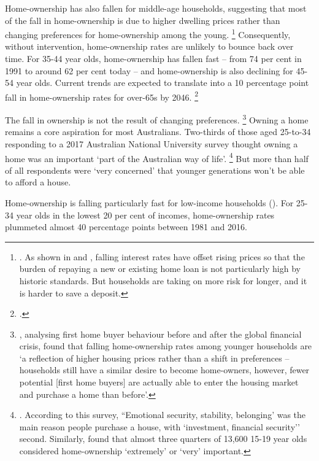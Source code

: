 Home-ownership has also fallen for middle-age households, suggesting that most of the fall in home-ownership is due to higher dwelling prices rather than changing preferences for home-ownership among the young.%
	\footnote{\textcites{Gradwell2017HousingBalance}{Eslake2013}.
	As shown in  and , falling interest rates have offset rising prices so that the burden of repaying a new or existing home loan is not particularly high by historic standards.
	But households are taking on more risk for longer, and it is harder to save a deposit.}
Consequently, without intervention, home-ownership rates are unlikely to bounce back over time.
For 35-44 year olds, home-ownership has fallen fast -- from 74 per cent in 1991 to around 62 per cent today -- and home-ownership is also declining for 45-54 year olds.
Current trends are expected to translate into a 10 percentage point fall in home-ownership rates for over-65s by 2046.%
	\footcite{YatesBradbury2010}

The fall in ownership is not the result of changing preferences.%
	\footnote{\textcite[][6]{Simon-Stone-2017-Property-Ladder}, analysing first home buyer behaviour before and after the global financial crisis, found that falling home-ownership rates among younger households are `a reflection of higher housing prices rather than a shift in preferences -- households still have a similar desire to become home-owners, however, fewer potential [first home buyers] are actually able to enter the housing market and purchase a home than before'.} 
Owning a home remains a core aspiration for most Australians. Two-thirds of those aged 25-to-34 responding to a 2017 Australian National University survey thought owning a home was an important `part of the Australian way of life'.%
	\footnote{\textcites{Sheppardetal2017}{Simon-Stone-2017-Property-Ladder}.
	According to this survey, ``Emotional security, stability, belonging' was the main reason people purchase a house, with `investment, financial security'' second.
	Similarly, \textcite[][23]{MissionAustralia2014} found that almost three quarters of 13,600 15-19 year olds considered home-ownership `extremely' or `very' important.}
But more than half of all respondents were `very concerned' that younger generations won't be able to afford a house.

Home-ownership is falling particularly fast for low-income households ().
For 25-34 year olds in the lowest 20 per cent of incomes, home-ownership rates plummeted almost 40 percentage points between 1981 and 2016.



